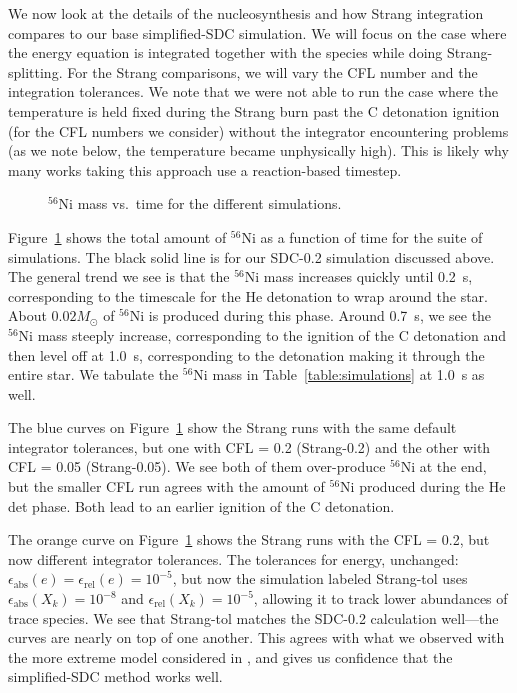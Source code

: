 \documentclass[preprint,linenumbers]{aastex631}
\newcommand{\isot}[2]{$^{#2}\mathrm{#1}$}
\begin{document}
We now look at the details of the nucleosynthesis
and how Strang integration compares to our base simplified-SDC simulation.  We will focus on the case where the energy equation is integrated together with the species while doing Strang-splitting.  For the Strang comparisons, we will vary the CFL number and the integration tolerances.
We note that we were not able to run the case where the temperature is held fixed during the Strang burn past the C detonation ignition (for the CFL numbers we consider) without the integrator encountering problems (as we note below, the temperature became unphysically high).  This is likely why many works taking this approach use a reaction-based timestep.

\begin{figure}[t]
\centering
{}
\caption{\label{fig:ni56} \isot{Ni}{56} mass vs.\ time for the different simulations.}
\end{figure}

Figure~\ref{fig:ni56} shows the total amount of \isot{Ni}{56} as a function of time for
the suite of simulations.  The black solid line is for our SDC-0.2 simulation discussed above.  The general trend we see is that the \isot{Ni}{56} mass increases quickly until 0.2~s, corresponding to the timescale for the He detonation to wrap around the star.  About $0.02 M_\odot$ of \isot{Ni}{56} is produced during this phase.  Around 0.7~s, we see the \isot{Ni}{56} mass steeply increase, corresponding to the ignition of the C detonation and then level off at 1.0~s, corresponding to the detonation making it through the entire star.  We tabulate the \isot{Ni}{56} mass in Table~\ref{table:simulations} at 1.0~s as well.

The blue curves on Figure~\ref{fig:ni56} show the Strang runs with the same default integrator tolerances, but one with CFL = 0.2 (Strang-0.2) and the other with CFL = 0.05 (Strang-0.05).  We see both of them over-produce \isot{Ni}{56} at the end, but the smaller CFL run agrees with the amount of \isot{Ni}{56} produced during the He det phase.  Both lead to an earlier ignition of the C detonation.

The orange curve on Figure~\ref{fig:ni56} shows the Strang runs with the CFL = 0.2, but now different integrator tolerances.  The tolerances for
energy, unchanged: $\epsilon_\mathrm{abs}(e) = \epsilon_\mathrm{rel}(e) = 10^{-5}$, but now the simulation
labeled Strang-tol uses $\epsilon_\mathrm{abs}(X_k) = 10^{-8}$ and $\epsilon_\mathrm{rel}(X_k) = 10^{-5}$, allowing it to track lower abundances of trace species.  We see that Strang-tol matches the SDC-0.2 calculation well---the curves are nearly on top of one another.  
This agrees with what we observed with the more extreme model considered in \citet{castro_simple_sdc}, and gives us confidence that the simplified-SDC method works well.
\end{document}
